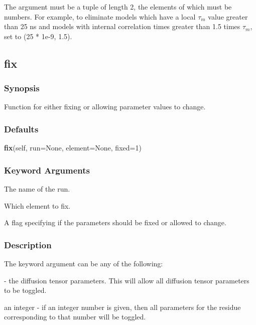 The  argument must be a tuple of length 2, the elements of which must be numbers.  For example, to eliminate models which have a local $\tau_m$ value greater than 25 ns and models with internal correlation times greater than 1.5 times $\tau_m$, set  to (25 * 1e-9, 1.5).




\newpage

\subsection{fix}


\subsubsection{Synopsis}

Function for either fixing or allowing parameter values to change.



\subsubsection{Defaults}

\textsf{\textbf{fix}(self, run=None, element=None, fixed=1)}


\subsubsection{Keyword Arguments}

  The name of the run. 

  Which element to fix. 

  A flag specifying if the parameters should be fixed or allowed to change. 




\subsubsection{Description}

The keyword argument  can be any of the following:


 - the diffusion tensor parameters.  This will allow all diffusion tensor parameters to be toggled.


an integer - if an integer number is given, then all parameters for the residue corresponding to that number will be toggled.


